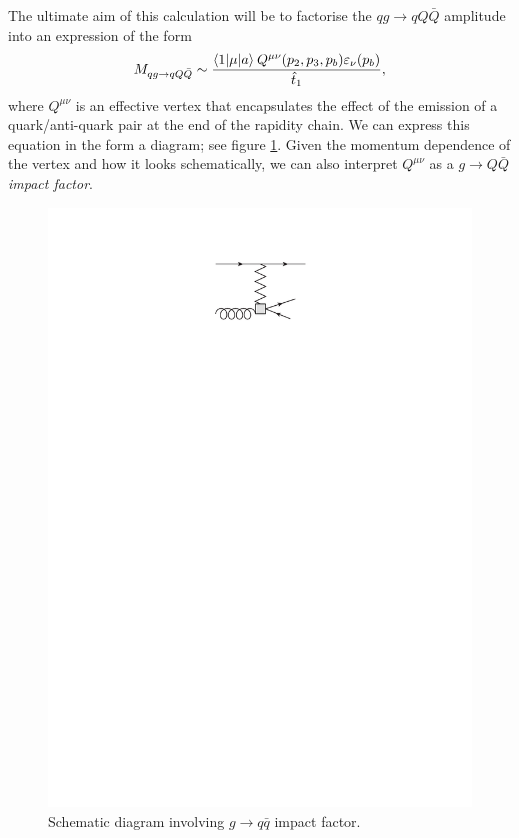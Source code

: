 The ultimate aim of this calculation will be to factorise the $qg \to qQ\bar{Q}$ amplitude into an expression of the form
\begin{equation}
M_{qg \to qQ\bar{Q}} \sim \frac{\mathinner{\langle1\vert\mu\vert a\rangle}_{}Q^{\mu \nu}(p_2, p_3, p_b) \varepsilon_\nu(p_b)}{\hat{t}_1},
\label{eqn:NLLeqn}
\end{equation}
where $Q^{\mu \nu}$ is an effective vertex that encapsulates the effect of the emission of a quark/anti-quark pair at the end of the rapidity chain. We can express this equation in the form a diagram; see figure \ref{fig:qgimp}. Given the momentum dependence of the vertex and how it looks schematically, we can also interpret $Q^{\mu \nu}$ as a $g \to Q \bar{Q}$ \emph{impact factor}.

\begin{figure}[t]
\centering
\includegraphics{Images/g_q_qbar_imp.pdf}
\caption{Schematic diagram involving $g \to q \bar{q}$ impact factor.}
\label{fig:qgimp}
\end{figure}

